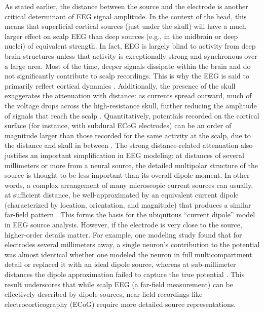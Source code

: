 \documentclass[final, a4paper,masters,en,listoffigures,listoftables,norwegiandates]{NMBU}
\begin{document}
As stated earlier, the distance between the source and the electrode is another critical determinant of EEG signal amplitude. In the context of the head, this means that superficial cortical sources (just under the skull) will have a much larger effect on scalp EEG than deep sources (e.g., in the midbrain or deep nuclei) of equivalent strength. In fact, EEG is largely blind to activity from deep brain structures unless that activity is exceptionally strong and synchronous over a large area. Most of the time, deeper signals dissipate within the brain and do not significantly contribute to scalp recordings. This is why the EEG is said to primarily reflect cortical dynamics \cite{Halnes2024ElectricBrainSignals}. Additionally, the presence of the skull exaggerates the attenuation with distance: as currents spread outward, much of the voltage drops across the high-resistance skull, further reducing the amplitude of signals that reach the scalp \cite{BIASIUCCI2019R80}. Quantitatively, potentials recorded on the cortical surface (for instance, with subdural ECoG electrodes) can be an order of magnitude larger than those recorded for the same activity at the scalp, due to the distance and skull in between \cite{Buzsaki2012}. The strong distance-related attenuation also justifies an important simplification in EEG modeling: at distances of several millimeters or more from a neural source, the detailed multipolar structure of the source is thought to be less important than its overall dipole moment. In other words, a complex arrangement of many microscopic current sources can usually, at sufficient distance, be well-approximated by an equivalent current dipole (characterized by location, orientation, and magnitude) that produces a similar far-field pattern \cite{Nunez2006, Næss2015}. This forms the basis for the ubiquitous “current dipole” model in EEG source analysis. However, if the electrode is very close to the source, higher-order details matter. For example, one modeling study found that for electrodes several millimeters away, a single neuron’s contribution to the potential was almost identical whether one modeled the neuron in full multicompartment detail or replaced it with an ideal dipole source, whereas at sub-millimeter distances the dipole approximation failed to capture the true potential \cite{Næss2015}. This result underscores that while scalp EEG (a far-field measurement) can be effectively described by dipole sources, near-field recordings like electrocorticography (ECoG) require more detailed source representations.
\end{document}
